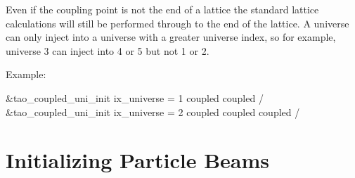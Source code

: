 {{{{Even if the coupling point is not the end of a lattice the standard lattice
calculations will still be performed through to the end of the
lattice.  A universe can only inject into a universe with a greater
universe index, so for example, universe 3 can inject into 4 or 5 but
not 1 or 2.

Example:
\begin{example}
  &tao_coupled_uni_init
    ix_universe = 1
    coupled%
    coupled%
  /
  &tao_coupled_uni_init
    ix_universe = 2
    coupled%
    coupled%
    coupled%
  /
\end{example}

\section{Initializing Particle Beams}
\label{s:beam_init}

}}}}
